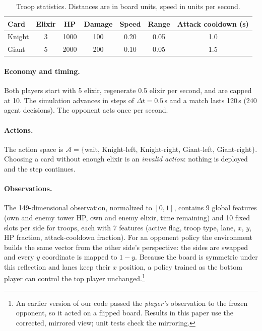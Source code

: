 \documentclass[11pt]{article}
\begin{document}
\begin{table}[h]
\centering
\small
\begin{tabular}{lcccccc}
\toprule
Card & Elixir & HP & Damage & Speed & Range & Attack cooldown (s) \\
\midrule
Knight & 3 & 1000 & 100 & 0.20 & 0.05 & 1.0 \\
Giant  & 5 & 2000 & 200 & 0.10 & 0.05 & 1.5 \\
\bottomrule
\end{tabular}
\caption{Troop statistics. Distances are in board units, speed in units per second.}
\label{tab:cards}
\end{table}

\paragraph{Economy and timing.}
Both players start with 5 elixir, regenerate 0.5 elixir per second, and are
capped at 10. The simulation advances in steps of $\Delta t = 0.5$\,s and a
match lasts 120\,s (240 agent decisions). The opponent acts once per second.

\paragraph{Actions.}
The action space is $\mathcal{A}=\{$wait, Knight-left, Knight-right,
Giant-left, Giant-right$\}$. Choosing a card without enough elixir is an
\emph{invalid action}: nothing is deployed and the step continues.

\paragraph{Observations.}
The 149-dimensional observation, normalized to $[0,1]$, contains 9 global
features (own and enemy tower HP, own and enemy elixir, time remaining) and
10 fixed slots per side for troops, each with 7 features (active flag, troop
type, lane, $x$, $y$, HP fraction, attack-cooldown fraction).
For an opponent policy the environment builds the same vector from the other
side's perspective: the sides are swapped and every $y$ coordinate is mapped
to $1-y$. Because the board is symmetric under this reflection and lanes keep
their $x$ position, a policy trained as the bottom player can control the top
player unchanged.\footnote{An earlier version of our code passed the
\emph{player's} observation to the frozen opponent, so it acted on a flipped
board. Results in this paper use the corrected, mirrored view; unit tests
check the mirroring.}
\end{document}

